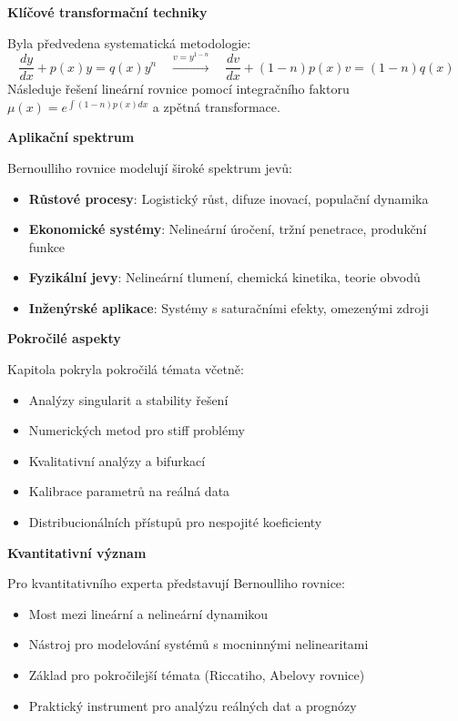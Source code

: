 \vspace{1\baselineskip}

\noindent\textbf{Klíčové transformační techniky}

Byla předvedena systematická metodologie:
\[
\frac{dy}{dx} + p(x)y = q(x)y^n \quad \xrightarrow{v = y^{1-n}} \quad \frac{dv}{dx} + (1-n)p(x)v = (1-n)q(x)
\]
Následuje řešení lineární rovnice pomocí integračního faktoru $\mu(x) = e^{\int (1-n)p(x)dx}$ a zpětná transformace.

\vspace{1\baselineskip}

\noindent\textbf{Aplikační spektrum}

Bernoulliho rovnice modelují široké spektrum jevů:
\begin{itemize}
\item \textbf{Růstové procesy}: Logistický růst, difuze inovací, populační dynamika
\item \textbf{Ekonomické systémy}: Nelineární úročení, tržní penetrace, produkční funkce
\item \textbf{Fyzikální jevy}: Nelineární tlumení, chemická kinetika, teorie obvodů
\item \textbf{Inženýrské aplikace}: Systémy s saturačními efekty, omezenými zdroji
\end{itemize}

\vspace{1\baselineskip}

\noindent\textbf{Pokročilé aspekty}

Kapitola pokryla pokročilá témata včetně:
\begin{itemize}
\item Analýzy singularit a stability řešení
\item Numerických metod pro stiff problémy
\item Kvalitativní analýzy a bifurkací
\item Kalibrace parametrů na reálná data
\item Distribucionálních přístupů pro nespojité koeficienty
\end{itemize}

\vspace{1\baselineskip}

\noindent\textbf{Kvantitativní význam}

Pro kvantitativního experta představují Bernoulliho rovnice:
\begin{itemize}
\item Most mezi lineární a nelineární dynamikou
\item Nástroj pro modelování systémů s mocninnými nelinearitami
\item Základ pro pokročilejší témata (Riccatiho, Abelovy rovnice)
\item Praktický instrument pro analýzu reálných dat a prognózy
\end{itemize}

